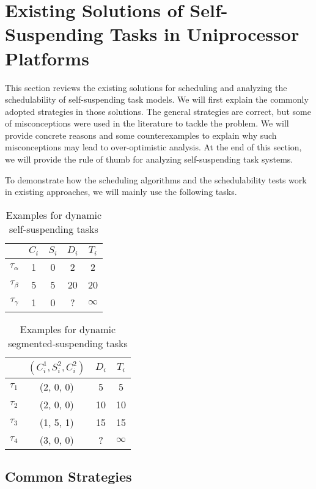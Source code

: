 \section{Existing Solutions of Self-Suspending Tasks in Uniprocessor Platforms}

This section reviews the existing solutions for scheduling and analyzing the schedulability of self-suspending task models. We will first explain the commonly adopted strategies in those solutions. The general strategies are correct, but some of misconceptions were used in the literature to tackle the problem. We will provide concrete reasons and some counterexamples to explain why such misconceptions may lead to over-optimistic analysis. At the end of this section, we will provide the rule of thumb for analyzing self-suspending task systems. 

To demonstrate how the scheduling algorithms and the schedulability tests work in existing approaches, we will mainly use the following tasks. 
\begin{table} 
    \begin{tabular}{|c|c|c|c|c|}
        & $C_i$ &  $S_i$&  $D_i$ & $T_i$\\ 
        \hline
        $\tau_\alpha$ & 1 & 0 &  2 & 2\\ 
        $\tau_\beta$ &  5&  5& 20 & 20 \\ 
        $\tau_\gamma$ & 1 & 0  & ? & $\infty$ \\ 
        \hline
    \end{tabular} 
    \caption{Examples for dynamic self-suspending tasks}
    \label{table:dynamic-example}
\end{table}

\begin{table} 
    \begin{tabular}{|c|c|c|c|}
        & $(C_i^1, S_i^2, C_i^2)$ &  $D_i$ & $T_i$\\ 
        \hline
        $\tau_1$ & (2, 0, 0) &  5 & 5\\ 
        $\tau_2$ &  (2, 0, 0) & 10 & 10 \\ 
        $\tau_3$ & (1, 5, 1) & 15  & 15\\
        $\tau_4$ & (3, 0, 0) & ? & $\infty$\\
        \hline
    \end{tabular} 
    \caption{Examples for dynamic segmented-suspending tasks}
        \label{table:segmented-example}
\end{table}


\subsection{Common Strategies}

